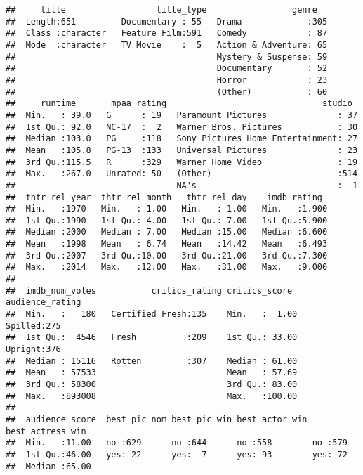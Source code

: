 \documentclass[]{article}
\begin{document}
\begin{verbatim}
##     title                  title_type                 genre    
##  Length:651         Documentary : 55   Drama             :305  
##  Class :character   Feature Film:591   Comedy            : 87  
##  Mode  :character   TV Movie    :  5   Action & Adventure: 65  
##                                        Mystery & Suspense: 59  
##                                        Documentary       : 52  
##                                        Horror            : 23  
##                                        (Other)           : 60  
##     runtime       mpaa_rating                               studio   
##  Min.   : 39.0   G      : 19   Paramount Pictures              : 37  
##  1st Qu.: 92.0   NC-17  :  2   Warner Bros. Pictures           : 30  
##  Median :103.0   PG     :118   Sony Pictures Home Entertainment: 27  
##  Mean   :105.8   PG-13  :133   Universal Pictures              : 23  
##  3rd Qu.:115.5   R      :329   Warner Home Video               : 19  
##  Max.   :267.0   Unrated: 50   (Other)                         :514  
##                                NA's                            :  1  
##  thtr_rel_year  thtr_rel_month   thtr_rel_day    imdb_rating   
##  Min.   :1970   Min.   : 1.00   Min.   : 1.00   Min.   :1.900  
##  1st Qu.:1990   1st Qu.: 4.00   1st Qu.: 7.00   1st Qu.:5.900  
##  Median :2000   Median : 7.00   Median :15.00   Median :6.600  
##  Mean   :1998   Mean   : 6.74   Mean   :14.42   Mean   :6.493  
##  3rd Qu.:2007   3rd Qu.:10.00   3rd Qu.:21.00   3rd Qu.:7.300  
##  Max.   :2014   Max.   :12.00   Max.   :31.00   Max.   :9.000  
##                                                                
##  imdb_num_votes           critics_rating critics_score    audience_rating
##  Min.   :   180   Certified Fresh:135    Min.   :  1.00   Spilled:275    
##  1st Qu.:  4546   Fresh          :209    1st Qu.: 33.00   Upright:376    
##  Median : 15116   Rotten         :307    Median : 61.00                  
##  Mean   : 57533                          Mean   : 57.69                  
##  3rd Qu.: 58300                          3rd Qu.: 83.00                  
##  Max.   :893008                          Max.   :100.00                  
##                                                                          
##  audience_score  best_pic_nom best_pic_win best_actor_win best_actress_win
##  Min.   :11.00   no :629      no :644      no :558        no :579         
##  1st Qu.:46.00   yes: 22      yes:  7      yes: 93        yes: 72         
##  Median :65.00                                                            

\end{verbatim}
\end{document}

